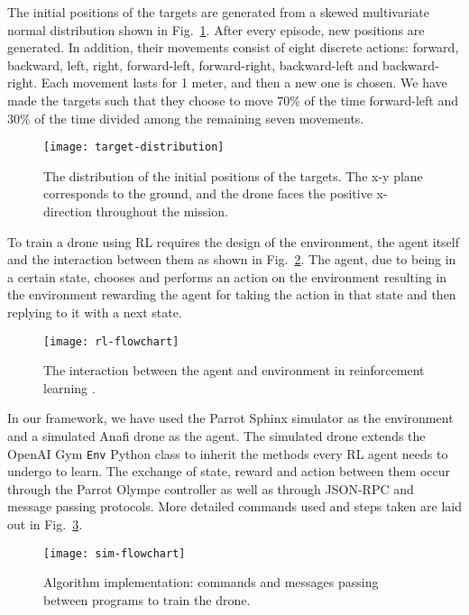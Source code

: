 \documentclass[../main.tex]{subfiles}
\begin{document}
The initial positions of the targets are generated from 
a skewed
multivariate normal distribution shown in Fig.~\ref{fig:position-distribution}.
After every episode, new positions are generated.
In addition, their movements consist of eight discrete
actions: forward, backward, left, right,
forward-left, forward-right, backward-left and backward-right.
Each movement lasts for 1 meter, and then a new one is
chosen.
We have made the targets such that they choose to move 70\% 
of the time forward-left and 30\% of the time divided
among the remaining seven movements.

\begin{figure}[!t]
	\centering
	\texttt{[image: target-distribution]}
	\caption{The distribution of the initial positions of the
		targets. The x-y plane corresponds to the ground, and 
		the drone faces the positive x-direction throughout the mission.}
	\label{fig:position-distribution}
\end{figure}

To train a drone using RL requires the
design of the environment, the agent itself and
the interaction between them as shown in Fig.~\ref{fig:rl}. 
The agent, due to being in a certain state, chooses and 
performs an action on
the environment resulting in the environment 
rewarding the agent for taking the action in that state
and then replying to it with a next state.

\begin{figure}[!t]
	\centering
	\texttt{[image: rl-flowchart]}
	\caption{The interaction between the agent and environment
		in reinforcement learning \cite{Sut20}.}
	\label{fig:rl}
\end{figure}

In our framework, we have used the Parrot Sphinx simulator
as the environment and a simulated Anafi drone as the agent.
The simulated drone extends the OpenAI Gym \texttt{Env} 
Python class
to inherit the methods every RL agent
needs to undergo to learn.
The exchange of state, reward and action between them 
occur through the Parrot Olympe controller as well as
through JSON-RPC and message passing protocols.
More detailed commands used and steps taken are laid out 
in Fig.~\ref{fig:flowchart}.

\begin{figure}[!t]
	\centering
	\texttt{[image: sim-flowchart]}
	\caption{Algorithm implementation: commands and messages passing
		between programs to train the drone.}
	\label{fig:flowchart}
\end{figure}
\end{document}
